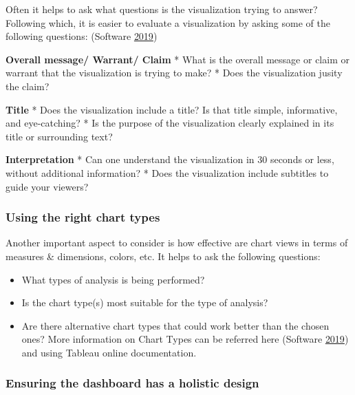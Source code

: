 \documentclass[]{book}
\providecommand{\tightlist}{%
  \setlength{\itemsep}{0pt}\setlength{\parskip}{0pt}}
\begin{document}
Often it helps to ask what questions is the visualization trying to answer? Following which, it is easier to evaluate a visualization by asking some of the following questions: (Software \protect\hyperlink{ref-analyze_viz}{2019})

\textbf{Overall message/ Warrant/ Claim}
* What is the overall message or claim or warrant that the visualization is trying to make?
* Does the visualization jusity the claim?

\textbf{Title}
* Does the visualization include a title? Is that title simple, informative, and eye-catching?
* Is the purpose of the visualization clearly explained in its title or surrounding text?

\textbf{Interpretation}
* Can one understand the visualization in 30 seconds or less, without additional information?
* Does the visualization include subtitles to guide your viewers?

\hypertarget{using-the-right-chart-types}{%
\subsubsection{Using the right chart types}\label{using-the-right-chart-types}}

Another important aspect to consider is how effective are chart views in terms of measures \& dimensions, colors, etc. It helps to ask the following questions:

\begin{itemize}
\tightlist
\item
  What types of analysis is being performed?
\item
  Is the chart type(s) most suitable for the type of analysis?
\item
  Are there alternative chart types that could work better than the chosen ones?
  More information on Chart Types can be referred here (Software \protect\hyperlink{ref-analyze_viz}{2019}) and using Tableau online documentation.
\end{itemize}

\hypertarget{ensuring-the-dashboard-has-a-holistic-design}{%
\subsubsection{Ensuring the dashboard has a holistic design}\label{ensuring-the-dashboard-has-a-holistic-design}}
\end{document}
